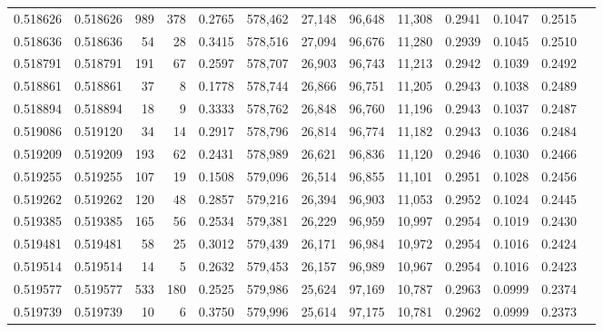 \begin{tabular}{rrrrrrrrrrrrr}
0.518626 & 0.518626 &   989 &   378 &                                     0.2765 & 578,462 &  27,148 &  96,648 &  11,308 & 0.2941 & 0.1047 & 0.2515 \\
0.518636 & 0.518636 &    54 &    28 &                                     0.3415 & 578,516 &  27,094 &  96,676 &  11,280 & 0.2939 & 0.1045 & 0.2510 \\
0.518791 & 0.518791 &   191 &    67 &                                     0.2597 & 578,707 &  26,903 &  96,743 &  11,213 & 0.2942 & 0.1039 & 0.2492 \\
0.518861 & 0.518861 &    37 &     8 &                                     0.1778 & 578,744 &  26,866 &  96,751 &  11,205 & 0.2943 & 0.1038 & 0.2489 \\
0.518894 & 0.518894 &    18 &     9 &                                     0.3333 & 578,762 &  26,848 &  96,760 &  11,196 & 0.2943 & 0.1037 & 0.2487 \\
0.519086 & 0.519120 &    34 &    14 &                                     0.2917 & 578,796 &  26,814 &  96,774 &  11,182 & 0.2943 & 0.1036 & 0.2484 \\
0.519209 & 0.519209 &   193 &    62 &                                     0.2431 & 578,989 &  26,621 &  96,836 &  11,120 & 0.2946 & 0.1030 & 0.2466 \\
0.519255 & 0.519255 &   107 &    19 &                                     0.1508 & 579,096 &  26,514 &  96,855 &  11,101 & 0.2951 & 0.1028 & 0.2456 \\
0.519262 & 0.519262 &   120 &    48 &                                     0.2857 & 579,216 &  26,394 &  96,903 &  11,053 & 0.2952 & 0.1024 & 0.2445 \\
0.519385 & 0.519385 &   165 &    56 &                                     0.2534 & 579,381 &  26,229 &  96,959 &  10,997 & 0.2954 & 0.1019 & 0.2430 \\
0.519481 & 0.519481 &    58 &    25 &                                     0.3012 & 579,439 &  26,171 &  96,984 &  10,972 & 0.2954 & 0.1016 & 0.2424 \\
0.519514 & 0.519514 &    14 &     5 &                                     0.2632 & 579,453 &  26,157 &  96,989 &  10,967 & 0.2954 & 0.1016 & 0.2423 \\
0.519577 & 0.519577 &   533 &   180 &                                     0.2525 & 579,986 &  25,624 &  97,169 &  10,787 & 0.2963 & 0.0999 & 0.2374 \\
0.519739 & 0.519739 &    10 &     6 &                                     0.3750 & 579,996 &  25,614 &  97,175 &  10,781 & 0.2962 & 0.0999 & 0.2373 \\

\end{tabular}
